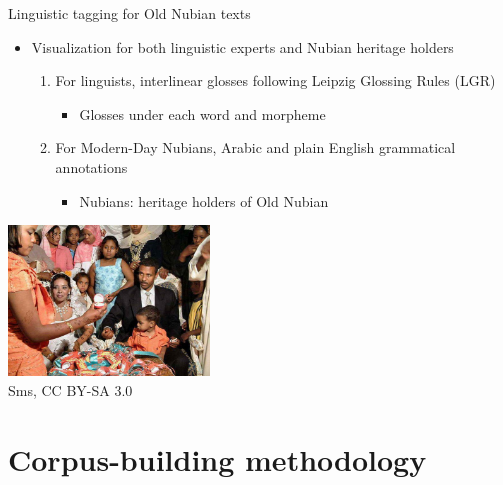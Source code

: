 \documentclass{beamer}
\begin{document}
\begin{frame}{Linguistic tagging for Old Nubian texts}
  \begin{itemize}
    \item Visualization for both linguistic experts and Nubian heritage holders
    \begin{enumerate}
      \item For linguists, interlinear glosses following Leipzig Glossing Rules (LGR)
       \begin{itemize}
          \item Glosses under each word and morpheme
        \end{itemize}
        \item For Modern-Day Nubians, Arabic and plain English grammatical annotations 
        \begin{itemize}
          \item Nubians: heritage holders of Old Nubian
        \end{itemize}
     \end{enumerate}
  \end{itemize}
  \begin{center}
  \includegraphics[width=0.4\textwidth]{nubian.jpg} 
\\ {\tiny Sms, CC BY-SA 3.0}
\end{center}
\end{frame}

\section{Corpus-building methodology}
\end{document}
